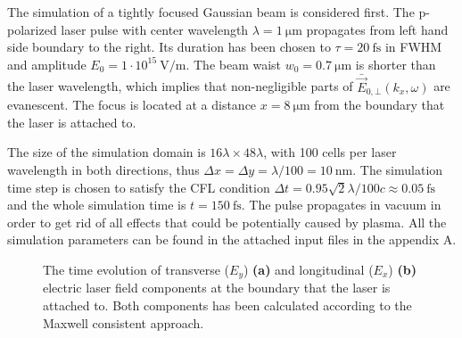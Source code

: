 The simulation of a tightly focused Gaussian beam is considered first. The p-polarized laser pulse with center wavelength $ \lambda = 1 \ \mathrm{\mu m} $ propagates from left hand side boundary to the right. Its duration has been chosen to $ \tau = 20 \ \mathrm{fs} $ in FWHM and amplitude $ E_0 = 1 \cdot 10^{15} \ \mathrm{V/m} $. The beam waist $ w_0 = 0.7 \ \mathrm{\mu m} $ is shorter than the laser wavelength, which implies that non-negligible parts of $ \bar{\vec{E}}_{0, \bot}(k_x, \omega) $ are evanescent. The focus is located at a distance $ x = 8 \ \mathrm{\mu m} $ from the boundary that the laser is attached to.

The size of the simulation domain is $ 16 \lambda \times 48 \lambda $, with 100 cells per laser wavelength in both directions, thus $ \Delta x = \Delta y = \lambda/100 = 10 \ \mathrm{nm} $. The simulation time step is chosen to satisfy the CFL condition \cite{CFL1967} $ \Delta t = 0.95 \sqrt{2} \lambda/ 100 c \approx 0.05 \ \mathrm{fs} $ and the whole simulation time is $ t = 150 \ \mathrm{fs} $. The pulse propagates in vacuum in order to get rid of all effects that could be potentially caused by plasma. All the simulation parameters can be found in the attached input files in the appendix A.

\begin{figure}[h!]
	\centering
	\hspace{2mm}
	\caption{The time evolution of transverse ($ E_{y} $) \textbf{(a)} and longitudinal ($ E_{x} $) \textbf{(b)} electric laser field components at the boundary that the laser is attached to. Both components has been calculated according to the Maxwell consistent approach.}
	\label{fig:3}
\end{figure}


